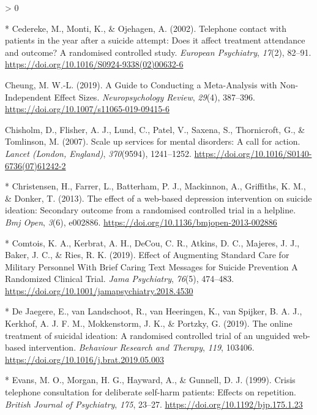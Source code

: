 \documentclass[
  english,
  man]{apa6}
\newlength{\cslhangindent}
\newenvironment{CSLReferences}[2] %
 {%
  \setlength{\parindent}{0pt}
  \ifodd #1 \everypar{\setlength{\hangindent}{\cslhangindent}}\ignorespaces\fi
  \ifnum #2 > 0
  \setlength{\parskip}{#2\baselineskip}
  \fi
 }%
 {}
\begin{document}
\begin{CSLReferences}{1}{0}
\leavevmode\hypertarget{ref-cedereke2002}{}%
* Cedereke, M., Monti, K., \& Ojehagen, A. (2002). Telephone contact with patients in the year after a suicide attempt: Does it affect treatment attendance and outcome? A randomised controlled study. \emph{European Psychiatry}, \emph{17}(2), 82--91. \url{https://doi.org/10.1016/S0924-9338(02)00632-6}

\leavevmode\hypertarget{ref-cheung2019}{}%
Cheung, M. W.-L. (2019). A {Guide} to {Conducting} a {Meta}-{Analysis} with {Non}-{Independent Effect Sizes}. \emph{Neuropsychology Review}, \emph{29}(4), 387--396. \url{https://doi.org/10.1007/s11065-019-09415-6}

\leavevmode\hypertarget{ref-chisholm2007}{}%
Chisholm, D., Flisher, A. J., Lund, C., Patel, V., Saxena, S., Thornicroft, G., \& Tomlinson, M. (2007). Scale up services for mental disorders: A call for action. \emph{Lancet (London, England)}, \emph{370}(9594), 1241--1252. \url{https://doi.org/10.1016/S0140-6736(07)61242-2}

\leavevmode\hypertarget{ref-christensen2013}{}%
* Christensen, H., Farrer, L., Batterham, P. J., Mackinnon, A., Griffiths, K. M., \& Donker, T. (2013). The effect of a web-based depression intervention on suicide ideation: Secondary outcome from a randomised controlled trial in a helpline. \emph{Bmj Open}, \emph{3}(6), e002886. \url{https://doi.org/10.1136/bmjopen-2013-002886}

\leavevmode\hypertarget{ref-comtois2019}{}%
* Comtois, K. A., Kerbrat, A. H., DeCou, C. R., Atkins, D. C., Majeres, J. J., Baker, J. C., \& Ries, R. K. (2019). Effect of {Augmenting Standard Care} for {Military Personnel With Brief Caring Text Messages} for {Suicide Prevention A Randomized Clinical Trial}. \emph{Jama Psychiatry}, \emph{76}(5), 474--483. \url{https://doi.org/10.1001/jamapsychiatry.2018.4530}

\leavevmode\hypertarget{ref-dejaegere2019}{}%
* De Jaegere, E., van Landschoot, R., van Heeringen, K., van Spijker, B. A. J., Kerkhof, A. J. F. M., Mokkenstorm, J. K., \& Portzky, G. (2019). The online treatment of suicidal ideation: A randomised controlled trial of an unguided web-based intervention. \emph{Behaviour Research and Therapy}, \emph{119}, 103406. \url{https://doi.org/10.1016/j.brat.2019.05.003}

\leavevmode\hypertarget{ref-evans1999}{}%
* Evans, M. O., Morgan, H. G., Hayward, A., \& Gunnell, D. J. (1999). Crisis telephone consultation for deliberate self-harm patients: Effects on repetition. \emph{British Journal of Psychiatry}, \emph{175}, 23--27. \url{https://doi.org/10.1192/bjp.175.1.23}


\end{CSLReferences}
\end{document}
